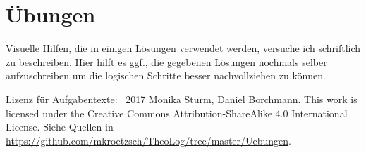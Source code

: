 \section{Übungen}
{\footnotesize Visuelle Hilfen, die in einigen Lösungen verwendet werden, versuche ich schriftlich zu beschreiben. Hier hilft es ggf., die gegebenen Lösungen nochmals selber aufzuschreiben um die logischen Schritte besser nachvollziehen zu können.

Lizenz für Aufgabentexte: \textcopyright\ 2017 Monika Sturm, Daniel Borchmann. This work is licensed under the Creative Commons Attribution-ShareAlike 4.0 International License. Siehe Quellen in \url{https://github.com/mkroetzsch/TheoLog/tree/master/Uebungen}.}









